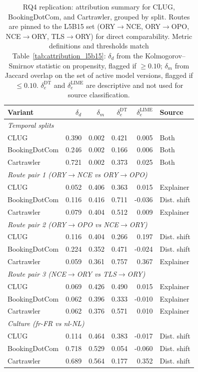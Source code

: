\begin{table}[ht]
\caption{RQ4 replication: attribution summary for CLUG, BookingDotCom, and Cartrawler, grouped by split. Routes are pinned to the L5B15 set (ORY$\to$NCE, ORY$\to$OPO, NCE$\to$ORY, TLS$\to$ORY) for direct comparability. Metric definitions and thresholds match Table~\ref{tab:attribution_l5b15}: $\delta_d$ from the Kolmogorov--Smirnov statistic on propensity, flagged if $\geq 0.10$; $\delta_m$ from Jaccard overlap on the set of active model versions, flagged if $\leq 0.10$. $\delta_e^{\mathrm{DT}}$ and $\delta_e^{\mathrm{LIME}}$ are descriptive and not used for source classification.}
\label{tab:attribution_replication}
\centering
\begin{tabular}{lrrrrl}
\toprule
Variant & $\delta_d$ & $\delta_m$ & $\delta_e^{\mathrm{DT}}$ & $\delta_e^{\mathrm{LIME}}$ & Source \\
\midrule
\multicolumn{6}{l}{\textit{Temporal splits}} \\
CLUG & 0.390 & 0.002 & 0.421 & 0.005 & Both \\
BookingDotCom & 0.246 & 0.002 & 0.166 & 0.006 & Both \\
Cartrawler & 0.721 & 0.002 & 0.373 & 0.025 & Both \\
\midrule
\multicolumn{6}{l}{\textit{Route pair 1 (ORY$\to$NCE vs ORY$\to$OPO)}} \\
CLUG & 0.052 & 0.406 & 0.363 & 0.015 & Explainer \\
BookingDotCom & 0.116 & 0.416 & 0.711 & -0.036 & Dist. shift \\
Cartrawler & 0.079 & 0.404 & 0.512 & 0.009 & Explainer \\
\midrule
\multicolumn{6}{l}{\textit{Route pair 2 (ORY$\to$OPO vs NCE$\to$ORY)}} \\
CLUG & 0.116 & 0.404 & 0.266 & 0.197 & Dist. shift \\
BookingDotCom & 0.224 & 0.352 & 0.471 & -0.024 & Dist. shift \\
Cartrawler & 0.059 & 0.361 & 0.757 & 0.367 & Explainer \\
\midrule
\multicolumn{6}{l}{\textit{Route pair 3 (NCE$\to$ORY vs TLS$\to$ORY)}} \\
CLUG & 0.069 & 0.426 & 0.490 & 0.015 & Explainer \\
BookingDotCom & 0.062 & 0.396 & 0.333 & -0.010 & Explainer \\
Cartrawler & 0.062 & 0.376 & 0.571 & 0.010 & Explainer \\
\midrule
\multicolumn{6}{l}{\textit{Culture (fr-FR vs nl-NL)}} \\
CLUG & 0.114 & 0.464 & 0.383 & -0.017 & Dist. shift \\
BookingDotCom & 0.718 & 0.529 & 0.054 & -0.060 & Dist. shift \\
Cartrawler & 0.689 & 0.564 & 0.177 & 0.352 & Dist. shift \\
\bottomrule
\end{tabular}
\end{table}
